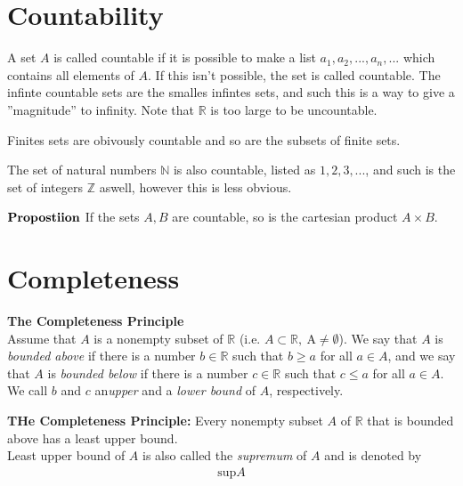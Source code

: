 \documentclass[12pt,letterpaper]{article}
\begin{document}
\section*{Countability}
A set $A$ is called countable if it is possible to make a list $a_1, a_2, ..., a_n,...$ which contains all elements of $A$. If this isn't possible, the set is called countable. 
The infinte countable sets are the smalles infintes sets, and such this is a way to give a ''magnitude'' to infinity. Note that $\mathbb{R}$ is too large to be uncountable.

\noindent
Finites sets are obivously countable and so are the subsets of finite sets.

\noindent
The set of natural numbers $\mathbb{N}$ is also countable, listed as $1,2,3,...$, and such is the set of integers $\mathbb{Z}$ aswell, however this is less obvious.

\noindent

$\bold{Propostiion}$ If the sets $A,B$ are countable, so is the cartesian product $A \times B$.



\section*{Completeness}


\textbf{The Completeness Principle} \\
\noindent
Assume that $A$ is a nonempty subset of $\mathbb{R}$ (i.e. $A \subset \mathbb{R}, \ $A$ \neq \emptyset$). We say that $A$ is \emph{bounded above} if there is a number $b\in\mathbb{R}$ such that $b\ge a$ for all $a\in A$, and we say that $A$ is \emph{bounded below} if there is a number $c\in\mathbb{R}$ such that $c\le a$ for all $a\in A$. We call $b$ and $c$ an\emph{upper} and a \emph{lower bound} of $A$, respectively.\\
\noindent

\textbf{THe Completeness Principle:} Every nonempty subset $A$ of $\mathbb{R}$ that is bounded above has a least upper bound. \\

Least upper bound of $A$ is also called the \emph{supremum} of $A$ and is denoted by 
\begin{align*}
	\text{sup} A
\end{align*}
\end{document}
